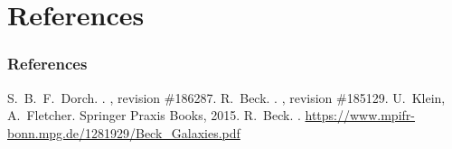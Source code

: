 \documentclass[mathserif]{beamer}
\begin{document}
\appendix
{}
\setcounter{finalframe}{\value{framenumber}}


\section{References}
\begin{frame}
    \frametitle<presentation>{References}

    \begin{thebibliography}{10}
    \beamertemplatearticlebibitems
        S.~B.~F.~Dorch.
        .
        , revision \#186287.
    \beamertemplatearticlebibitems
        R.~Beck.
        .
        , revision \#185129.
    \beamertemplatebookbibitems
        U.~Klein, A.~Fletcher.
        \newblock Springer Praxis Books, 2015.
    \beamertemplateonlinebibitems
        R.~Beck.
        .
        \newblock \url{https://www.mpifr-bonn.mpg.de/1281929/Beck_Galaxies.pdf}
    \end{thebibliography}

\end{frame}


\setcounter{framenumber}{\value{finalframe}}
\end{document}
